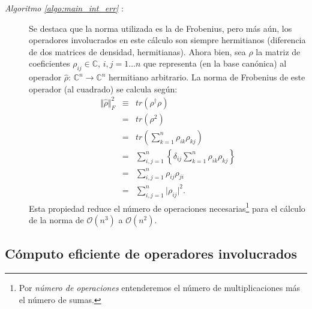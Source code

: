 \begin{description}
\item[\emph{Algoritmo \ref{algo:main_int_err}} :] Se destaca que la norma utilizada es la de Frobenius, pero m\'as a\'un, los operadores involucrados en este c\'alculo son siempre hermitianos (diferencia de dos matrices de densidad, hermitianas). Ahora bien, sea $\rho$ la matriz de coeficientes $\rho_{ij}\in \mathbb{C},\,i,j=1\ldots n$ que representa (en la base can\'onica) al operador $\hat{\rho}:\,\mathbb{C}^n\rightarrow \mathbb{C}^n$ hermitiano arbitrario. La norma de Frobenius de este operador (al cuadrado) se calcula seg\'un:
\begin{eqnarray}
 \Vert \hat{\rho} \Vert_F^2 &\equiv& tr\left( \rho^\dag\rho \right)\label{ec:frob_inicial}\\
&=&tr\left( \rho^2 \right)\\
&=& tr\left( \sum_{k=1}^n\rho_{ik}\rho_{kj} \right)\\
&=&\sum_{i,j=1}^n\left\{ \delta_{ij} \sum_{k=1}^n\rho_{ik}\rho_{kj} \right\} \\
&=&\sum_{i,j=1}^n\rho_{ij}\rho_{ji}\\
&=&\sum_{i,j=1}^n \vert \rho_{ij} \vert^2.\label{ec:frob_final}
\end{eqnarray}
\quad Esta propiedad reduce el n\'umero de operaciones necesarias\footnote{\label{pie:numero_peraciones}Por \emph{n\'umero de operaciones} entenderemos el n\'umero de multiplicaciones m\'as el n\'umero de sumas.} para el c\'alculo de la norma de $\mathcal{O}(n^3)$ a $\mathcal{O}(n^2)$.
\end{description}

\subsection{C\'omputo eficiente de operadores involucrados}\label{sec:cal_operadores_involucrados}

